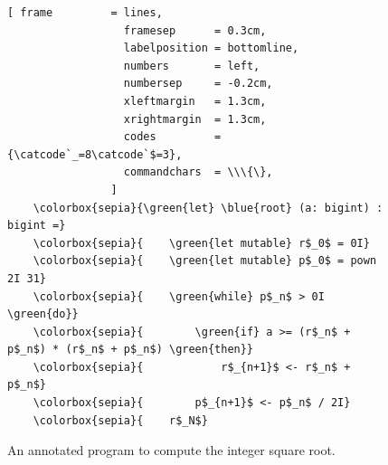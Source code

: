 \begin{figure}[!h]
\centering
\begin{Verbatim}[ frame         = lines, 
                  framesep      = 0.3cm, 
                  labelposition = bottomline,
                  numbers       = left,
                  numbersep     = -0.2cm,
                  xleftmargin   = 1.3cm,
                  xrightmargin  = 1.3cm,
                  codes         = {\catcode`_=8\catcode`$=3},
                  commandchars  = \\\{\},
                ]
    \colorbox{sepia}{\green{let} \blue{root} (a: bigint) : bigint =}
    \colorbox{sepia}{    \green{let mutable} r$_0$ = 0I}
    \colorbox{sepia}{    \green{let mutable} p$_0$ = pown 2I 31}
    \colorbox{sepia}{    \green{while} p$_n$ > 0I \green{do}}
    \colorbox{sepia}{        \green{if} a >= (r$_n$ + p$_n$) * (r$_n$ + p$_n$) \green{then}}
    \colorbox{sepia}{            r$_{n+1}$ <- r$_n$ + p$_n$}
    \colorbox{sepia}{        p$_{n+1}$ <- p$_n$ / 2I}
    \colorbox{sepia}{    r$_N$}
\end{Verbatim}
\vspace*{-0.3cm}
\caption{An annotated program to compute the integer square root.}
\label{fig:Integer-Square-Root-Iterative.ipynb}
\end{figure} %

